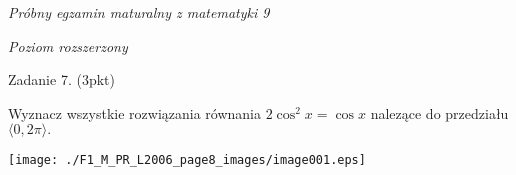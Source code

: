 \documentclass[a4paper,12pt]{article}
\begin{document}
{\it Próbny egzamin maturalny z matematyki 9}

{\it Poziom rozszerzony}

Zadanie 7. (3pkt)

Wyznacz wszystkie rozwiązania równania $2\cos^{2}x=\cos x$ nalezące do przedziału $\langle 0,2\pi\rangle.$
\begin{center}
\texttt{[image: ./F1\_M\_PR\_L2006\_page8\_images/image001.eps]}
\end{center}
\end{document}
